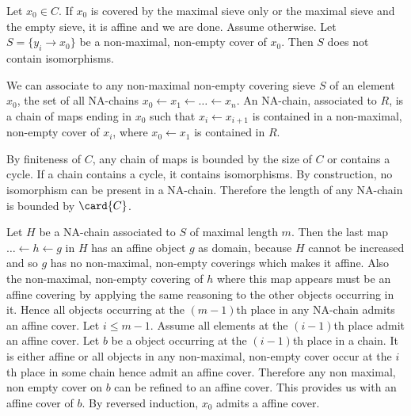 Let $x_0\in C$. 
If $x_0$ is covered by the maximal sieve only or the maximal sieve and the empty sieve, it is affine and we are done. 
Assume otherwise.
Let $S = \{y_i \rightarrow x_0\}$ be a non-maximal, non-empty cover of $x_0$.
Then $S$ does not contain isomorphisms.

We can associate to any non-maximal non-empty covering sieve $S$ of an element $x_0$,
the set of all NA-chains $x_0\leftarrow x_1 \leftarrow \ldots \leftarrow x_n$.
An NA-chain, associated to $R$, is a chain of maps ending in $x_0$ such that $x_i \leftarrow x_{i+1}$ is contained in a non-maximal, 
non-empty cover of $x_i$, where $x_0\leftarrow x_1$ is contained in $R$.

By finiteness of $C$, any chain of maps is bounded by the size of $C$ or contains a cycle. 
If a chain contains a cycle, it contains isomorphisms. 
By construction, no isomorphism can be present in a NA-chain. 
Therefore the length of any NA-chain is bounded by $\card{C}$.

Let $H$ be a NA-chain associated to $S$ of maximal length $m$. 
Then the last map $\ldots \leftarrow h \leftarrow g$ in $H$ has an affine object $g$ as domain,
because $H$ cannot be increased and so $g$ has no non-maximal, non-empty coverings which makes it affine.
Also the non-maximal, non-empty covering of $h$ where this map appears must be an affine covering by applying the same reasoning to the other objects occurring in it. 
Hence all objects occurring at the $(m-1)$th place in any NA-chain admits an affine cover.
Let $i\leq m-1$. Assume all elements at the $(i-1)$th place admit an affine cover. 
Let $b$ be a object occurring at the $(i-1)$th place in a chain. It is either affine or all objects in any non-maximal, non-empty cover occur at the $i$th place in some chain hence admit an affine cover. Therefore any non maximal, non empty cover on $b$ can be refined to an affine cover. This provides us with an affine cover of $b$.
By reversed induction, $x_0$ admits a affine cover.